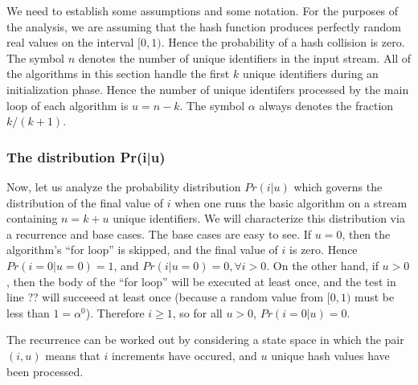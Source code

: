 \documentclass{sig-alternate}
\begin{document}

We need to establish some assumptions and some notation. For the
purposes of the analysis, we are assuming that the hash function
produces perfectly random real values on the interval $[0,1)$.  Hence
the probability of a hash collision is zero. The symbol $n$
denotes the number of unique identifiers in the input stream. All of
the algorithms in this section handle the first $k$ unique
identifiers during an initialization phase. Hence the number of unique
identifers processed by the main loop of each algorithm is $u = n - k$.
The symbol $\alpha$ always denotes the fraction $k/(k+1)$.

\subsubsection{The distribution \;Pr(\;i\;|\;u\;)}
Now, let us analyze the probability distribution $Pr(i|u)$ which
governs the distribution of the final value of $i$ when one runs
the basic algorithm
on a stream containing $n = k + u$ unique identifiers. We will characterize this
distribution via a recurrence and base cases.  The base cases are 
easy to see. If $u = 0$, then the algorithm's ``for loop'' is skipped,
and the final value of $i$ is zero. Hence $Pr(i=0|u=0) = 1$, and $Pr(i |u=0) = 0, \forall i > 0$.
On the other hand, if $u > 0$, then the body of the ``for loop'' will be
executed at least once, and the test in line ?? will succeeed at least once
(because a random value from $[0,1)$ must be less than $1 = \alpha^0$).
Therefore $i \geq 1$, so for all $u > 0$, $Pr(i=0 |u) = 0$.

The recurrence can be worked out by considering a state space in which the pair $(i,u)$
means that $i$ increments have occured, and  $u$ unique hash values have been processed.
\end{document}
